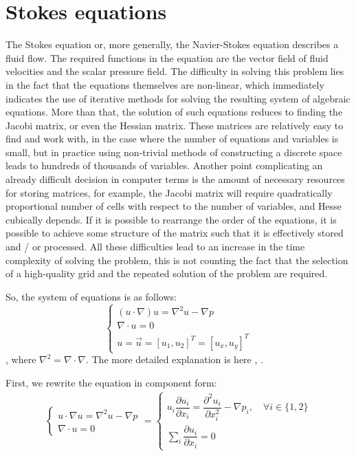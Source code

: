 \section{Stokes equations}
The Stokes equation or, more generally, the Navier-Stokes equation describes a fluid flow. The required functions in the equation are the vector field of fluid velocities and the scalar pressure field. The difficulty in solving this problem lies in the fact that the equations themselves are non-linear, which immediately indicates the use of iterative methods for solving the resulting system of algebraic equations. More than that, the solution of such equations reduces to finding the Jacobi matrix, or even the Hessian matrix. These matrices are relatively easy to find and work with, in the case where the number of equations and variables is small, but in practice using non-trivial methods of constructing a discrete space leads to hundreds of thousands of variables. Another point complicating an already difficult decision in computer terms is the amount of necessary resources for storing matrices, for example, the Jacobi matrix will require  quadratically proportional number of cells with respect to the number of variables, and Hesse cubically depends. If it is possible to rearrange the order of the equations, it is possible to achieve some structure of the matrix such that it is effectively stored and / or processed. All these difficulties lead to an increase in the time complexity of solving the problem, this is not counting the fact that the selection of a high-quality grid and the repeated solution of the problem are required.

So, the system of equations is as follows:
\begin{equation}
	\begin{cases}
		\left ( u \cdot \nabla \right ) u = \nabla^2 u - \nabla p \\
		\nabla \cdot u = 0 \\
		u = \vec{u} =  \left [ u_1, u_2 \right ]^T = \left [ u_x, u_y \right ]^T
	\end{cases}
\end{equation}
, where $\nabla^2 = \nabla \cdot \nabla$. The more detailed explanation is here \cite{temam1979navier}, \cite{rieutord2014fluid}.

First, we rewrite the equation in component form:
\begin{equation}
	\begin{multlined}
		\begin{cases}
			u \cdot \nabla u = \nabla^2 u - \nabla p \\[10pt]
			\nabla \cdot u = 0
		\end{cases} = 
		\begin{cases}
			u_i \dfrac{\partial u_i}{\partial x_i} = \dfrac{\partial^2 u_i}{\partial x_i^2} - \nabla p_i, \quad \forall i \in \{1, 2\} \\[10pt]
			\sum_i \dfrac{\partial u_i}{\partial x_i} = 0
		\end{cases}
	\end{multlined}
\end{equation}

